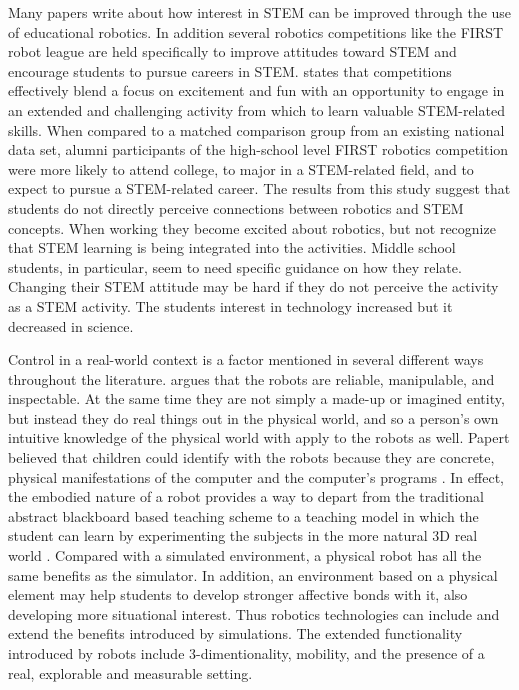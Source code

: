 \bigskip\noindent
Many papers write about how interest in STEM can be improved through the use of educational robotics. In addition several robotics competitions like the FIRST robot league are held specifically to improve attitudes toward STEM and encourage students to pursue careers in STEM.  states that competitions effectively blend a focus on excitement and fun with an opportunity to engage in an extended and challenging activity from which to learn valuable STEM-related skills. When compared to a matched comparison group from an existing national data set, alumni participants of the high-school level FIRST robotics competition were more likely to attend college, to major in a STEM-related field, and to expect to pursue a STEM-related career.  The results from this study suggest that students do not directly perceive connections between robotics and STEM concepts. When working they become excited about robotics, but not recognize that STEM learning is being integrated into the activities. Middle school students, in particular, seem to need specific guidance on how they relate. Changing their STEM attitude may be hard if they do not perceive the activity as a STEM activity. The students interest in technology increased but it decreased in science.

\bigskip\noindent
Control in a real-world context is a factor mentioned in several different ways throughout the literature.  argues that the robots are reliable, manipulable, and inspectable. At the same time they are not simply a made-up or imagined entity, but instead they do real things out in the physical world, and so a person's own intuitive knowledge of the physical world with apply to the robots as well. Papert believed that children could identify with the robots because they are concrete, physical manifestations of the computer and the computer's programs \cite{papert1980mindstorms}. In effect, the embodied nature of a robot provides a way to depart from the traditional abstract blackboard based teaching scheme to a teaching model in which the student can learn by experimenting the subjects in the more natural 3D real world \cite{mitnik2009collaborative}. Compared with a simulated environment, a physical robot has all the same benefits as the simulator. In addition, an environment based on a physical element may help students to develop stronger affective bonds with it, also developing more situational interest. Thus robotics technologies can include and extend the benefits introduced by simulations. The extended functionality introduced by robots include 3-dimentionality, mobility, and the presence of a real, explorable and measurable setting. 

